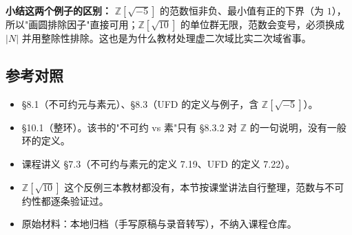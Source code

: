 \textbf{小结这两个例子的区别：} $\mathbb Z[\sqrt{-5}]$ 的范数恒非负、最小值有正的下界（为 $1$），所以"画圆排除因子"直接可用；$\mathbb Z[\sqrt{10}]$ 的单位群无限，范数会变号，必须换成 $|N|$ 并用整除性排除。这也是为什么教材处理虚二次域比实二次域省事。

\subsection{参考对照}


\begin{itemize}
\item [DF] §8.1（不可约元与素元）、§8.3（UFD 的定义与例子，含 $\mathbb Z[\sqrt{-5}]$）。
\item [DS] §10.1（整环）。该书的"不可约 vs 素"只有 §8.3.2 对 $\mathbb Z$ 的一句说明，没有一般环的定义。
\item 课程讲义 §7.3（不可约与素元的定义 7.19、UFD 的定义 7.22）。
\item $\mathbb Z[\sqrt{10}]$ 这个反例三本教材都没有，本节按课堂讲法自行整理，范数与不可约性都逐条验证过。
\item 原始材料：本地归档（手写原稿与录音转写），不纳入课程仓库。
\end{itemize}
